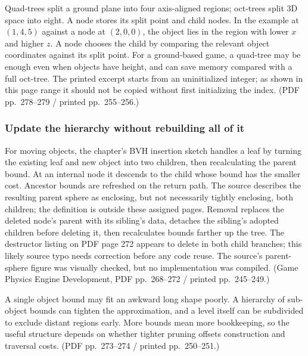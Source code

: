 Quad-trees split a ground plane into four axis-aligned regions; oct-trees split 3D space into eight. A node stores its split point and child nodes. In the example at \((1,4,5)\) against a node at \((2,0,0)\), the object lies in the region with lower \(x\) and higher \(z\). A node chooses the child by comparing the relevant object coordinates against its split point. For a ground-based game, a quad-tree may be enough even when objects have height, and can save memory compared with a full oct-tree. The printed  excerpt starts from an uninitialized integer; as shown in this page range it should not be copied without first initializing the index. (PDF pp.~278--279 / printed pp.~255--256.)

\subsubsection{Update the hierarchy without rebuilding all of it}\label{06-engine-ii-ch033-update-the-hierarchy-without-rebuilding-all-of-it}

\hypertarget{06-engine-ii-ch033-update-the-hierarchy-without-rebuilding-all-of-it}{}

For moving objects, the chapter's BVH insertion sketch handles a leaf by turning the existing leaf and new object into two children, then recalculating the parent bound. At an internal node it descends to the child whose bound has the smaller  cost. Ancestor bounds are refreshed on the return path. The source describes the resulting parent sphere as enclosing, but not necessarily tightly enclosing, both children; the  definition is outside these assigned pages. Removal replaces the deleted node's parent with its sibling's data, detaches the sibling's adopted children before deleting it, then recalculates bounds farther up the tree. The destructor listing on PDF page 272 appears to delete  in both child branches; this likely source typo needs correction before any code reuse. The source's parent-sphere figure was visually checked, but no implementation was compiled. (Game Physics Engine Development, PDF pp.~268--272 / printed pp.~245--249.)

A single object bound may fit an awkward long shape poorly. A hierarchy of sub-object bounds can tighten the approximation, and a level itself can be subdivided to exclude distant regions early. More bounds mean more bookkeeping, so the useful structure depends on whether tighter pruning offsets construction and traversal costs. (PDF pp.~273--274 / printed pp.~250--251.)

